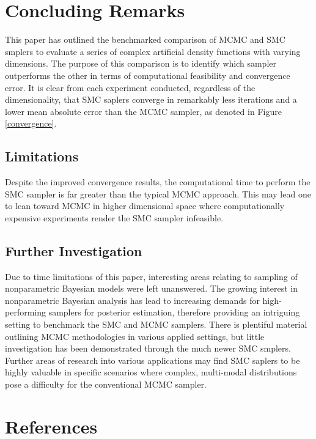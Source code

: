 \documentclass[12pt]{elsarticle}
\begin{document}
\section*{Concluding Remarks}
This paper has outlined the benchmarked comparison of MCMC and SMC smplers to evaluate a series of complex artificial density functions with varying dimensions. The purpose of this comparison is to identify which sampler outperforms the other in terms of computational feasibility and convergence error. It is clear from each experiment conducted, regardless of the dimensionality, that SMC saplers converge in remarkably less iterations and a lower mean absolute error than the MCMC sampler, as denoted in Figure \ref{convergence}. \\

\subsection*{Limitations}
Despite the improved convergence results, the computational time to perform the SMC sampler is far greater than the typical MCMC approach. This may lead one to lean toward MCMC in higher dimensional space where computationally expensive experiments render the SMC sampler infeasible.

\subsection*{Further Investigation}
Due to time limitations of this paper, interesting areas relating to sampling of nonparametric Bayesian models were left unanswered. The growing interest in nonparametric Bayesian analysis has lead to increasing demands for high-performing samplers for posterior estimation, therefore providing an intriguing setting to benchmark the SMC and MCMC samplers. There is plentiful material outlining MCMC methodologies in various applied settings, but little investigation has been demonstrated through the much newer SMC smplers. Further areas of research into various applications may find SMC saplers to be highly valuable in specific scenarios where complex, multi-modal distributions pose a difficulty for the conventional MCMC sampler.


\section*{References}
%
\nocite{Bishop2007}
\nocite{Murphy2012}
\nocite{Lindsten2014}


\end{document}
